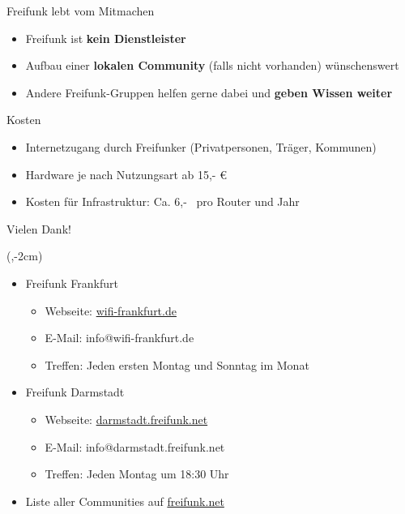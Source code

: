\documentclass[t]{beamer}
\begin{document}
  \begin{frame}{Freifunk lebt vom Mitmachen}
    \begin{itemize}
      \item Freifunk ist \textbf{kein Dienstleister}
      \item Aufbau einer \textbf{lokalen Community} (falls nicht vorhanden) wünschenswert
      \item Andere Freifunk-Gruppen helfen gerne dabei und \textbf{geben Wissen weiter}
    \end{itemize}
  \end{frame}

  \begin{frame}{Kosten}
    \begin{itemize}
      \item Internetzugang durch Freifunker (Privatpersonen, Träger, Kommunen)
      \item Hardware je nach Nutzungsart ab 15,- €
      \item Kosten für Infrastruktur: Ca. 6,- \texteuro\ pro Router und Jahr
    \end{itemize}
  \end{frame}


  \begin{frame}{Vielen Dank!}
    \begin{textblock*}{0cm}(\textwidth-2cm,-2cm)
      \begin{figure}[h]
        \def\svgwidth{2.5cm}
        
      \end{figure}
    \end{textblock*}
    \begin{itemize}
      \item Freifunk Frankfurt
      \begin{itemize}
        \item Webseite: \href{http://wifi-frankfurt.de}{wifi-frankfurt.de}
        \item E-Mail: info@wifi-frankfurt.de
        \item Treffen: Jeden ersten Montag und Sonntag im Monat
      \end{itemize}
      \item Freifunk Darmstadt
      \begin{itemize}
        \item Webseite: \href{http://darmstadt.freifunk.net/}{darmstadt.freifunk.net}
        \item E-Mail: info@darmstadt.freifunk.net
        \item Treffen: Jeden Montag um 18:30 Uhr
      \end{itemize}
      \vspace{1em}
      \item Liste aller Communities auf \href{https://freifunk.net/}{freifunk.net}
    \end{itemize}
  \end{frame}
\end{document}
